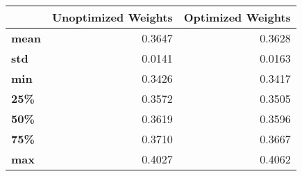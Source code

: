 \begin{tabular}{lrr}
\toprule
{} &  Unoptimized Weights &  Optimized Weights \\
\midrule
\textbf{mean} &               0.3647 &             0.3628 \\
\textbf{std } &               0.0141 &             0.0163 \\
\textbf{min } &               0.3426 &             0.3417 \\
\textbf{25\% } &               0.3572 &             0.3505 \\
\textbf{50\% } &               0.3619 &             0.3596 \\
\textbf{75\% } &               0.3710 &             0.3667 \\
\textbf{max } &               0.4027 &             0.4062 \\
\bottomrule
\end{tabular}
